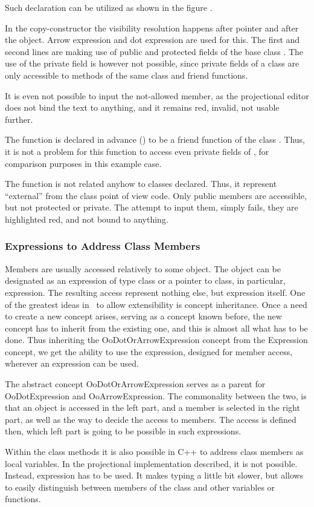 Such declaration can be utilized as shown in the figure .


In the copy-constructor the visibility resolution happens after  pointer
and after the  object. Arrow expression and dot expression are used for
this. The first and second lines are making use of public and protected fields of 
the base class . The use of the private field is however not possible, since
private fields of a class are only accessible to methods of the same class and
friend functions. 

It is even not possible to input the not-allowed member, as the projectional editor
does not bind the text to anything, and it remains red, invalid, not usable further.


The  function is declared in advance () to be a friend 
function of the class . Thus, it is not a problem for this function to access
even private fields of , for comparison purposes in this example case.

The function  is not related anyhow to classes declared. Thus,
it represent ``external'' from the class point of view code. Only public members
are accessible, but not protected or private. The attempt to input them, simply
fails, they are highlighted red, and not bound to anything.


\subsubsection{Expressions to Address Class Members}


Members are usually accessed relatively to some object. The object can be designated as an expression of type class or a pointer to class,
in particular,  expression. The resulting access represent nothing else, but expression itself. 
One of the greatest ideas in \jbmps\ to allow extensibility is concept inheritance. Once a need to create a new concept arises, serving as a 
concept known before, the new concept has to inherit from the existing one, and this is almost all what has to be done.
Thus inheriting the OoDotOrArrowExpression concept from the Expression concept, we get the ability to use the expression, designed for member 
access, wherever an expression can be used. 

The abstract concept OoDotOrArrowExpression serves as a parent for OoDotExpression and OoArrowExpression. The commonality between the two, is
that an object is accessed in the left part, and a member is selected in the right part, as well as the way to decide the access to members.
The access is defined then, which left part is going to be possible in such expressions.


Within the class methods it is also possible in C++ to address class members as local variables. In the projectional implementation
described, it is not possible. Instead,  expression has to be used. It makes typing a little bit slower, but allows to
easily distinguish between members of the class and other variables or functions.
